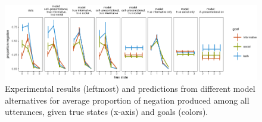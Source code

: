 \documentclass[12pt]{article}
\begin{document}

\begin{figure}
\centering
\includegraphics{fig/negationPredictionComp-1.pdf}
\caption{\label{fig:negationPredictionComp}Experimental results (leftmost)
and predictions from different model alternatives for average proportion
of negation produced among all utterances, given true states (x-axis)
and goals (colors).}
\end{figure}






%
\end{document}
